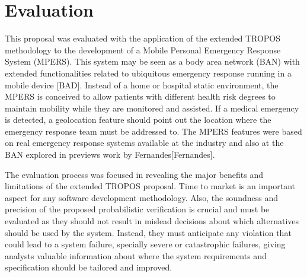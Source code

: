 


\section{Evaluation}

This proposal was evaluated with the application of the extended TROPOS methodology to the development of a Mobile Personal Emergency Response System (MPERS). This system may be seen as a body area network (BAN) with extended functionalities related to ubiquitous emergency response running in a mobile device [BAD]. Instead of a home or hospital static environment, the MPERS is conceived to allow patients with different health risk degrees to maintain mobility while they are monitored and assisted. If a medical emergency is detected, a geolocation feature should point out the location where the emergency response team must be addressed to. The MPERS features were based on real emergency response systems available at the industry and also at the BAN explored in previews work by Fernandes[Fernandes].

The evaluation process was focused in revealing the major benefits and limitations of the extended TROPOS proposal. Time to market is an important aspect for any software development methodology. Also, the soundness and precision of the proposed probabilistic verification is crucial and must be evaluated as they should not result in mislead decisions about which alternatives should be used by the system. Instead, they must anticipate any violation that could lead to a system failure, specially severe or catastrophic failures, giving analysts valuable information about where the system requirements and specification should be tailored and improved.

